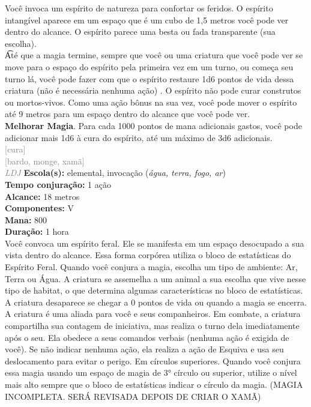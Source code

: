 \documentclass{RPG_Adventure}[2021/10/20]
\begin{document}
{\normalsize Você invoca um espírito de natureza para confortar os feridos. O espírito intangível aparece em um espaço que é um cubo de 1,5 metros você pode ver dentro do alcance. O espírito parece uma besta ou fada transparente (sua escolha).\\\t Até que a magia termine, sempre que você ou uma criatura que você pode ver se move para o espaço do espírito pela primeira vez em um turno, ou começa seu turno lá, você pode fazer com que o espírito restaure 1d6 pontos de vida dessa criatura (não é necessária nenhuma ação) . O espírito não pode curar construtos ou mortos-vivos. Como uma ação bônus na sua vez, você pode mover o espírito até 9 metros para um espaço dentro do alcance que você pode ver.\\\t \textbf{Melhorar Magia}. Para cada 1000 pontos de mana adicionais gastos, você pode adicionar mais 1d6 à cura do espírito, até um máximo de 3d6 adicionais.\\}
{\scriptsize \textcolor{gray}{[cura]\\}}
{\scriptsize \textcolor{gray}{[bardo, monge, xamã]\\}}
{\tiny \textcolor{gray}{\textit{LDJ}}}\jump{}
{\small \t \textbf{Escola(s):} elemental, invocação (\textit{água, terra, fogo, ar})\\\t \textbf{Tempo conjuração:} 1 ação\\\t \textbf{Alcance:} 18 metros\\\t \textbf{Componentes:} V\\\t \textbf{Mana:} 800\\\t \textbf{Duração:} 1 hora\\}
{\normalsize Você convoca um espírito feral. Ele se manifesta em um espaço desocupado a sua vista dentro do alcance. Essa forma corpórea utiliza o bloco de estatísticas do Espírito Feral. Quando você conjura a magia, escolha um tipo de ambiente: Ar, Terra ou Água. A criatura se assemelha a um animal a sua escolha que vive nesse tipo de habitat, o que determina algumas características no bloco de estatísticas.  A criatura desaparece se chegar a 0 pontos de vida ou quando a magia se encerra. A criatura é uma aliada para você e seus companheiros.  Em combate, a criatura compartilha sua contagem de iniciativa, mas realiza o turno dela imediatamente após o seu. Ela obedece a seus comandos verbais (nenhuma ação é exigida de você). Se não indicar nenhuma ação, ela realiza a ação de Esquiva e usa seu deslocamento para evitar o perigo.  Em círculos superiores. Quando você conjura essa magia usando um espaço de magia de 3° círculo ou superior, utilize o nível mais alto sempre que o bloco de estatísticas indicar o círculo da magia. (MAGIA INCOMPLETA. SERÁ REVISADA DEPOIS DE CRIAR O XAMÃ)\\}
\end{document}
